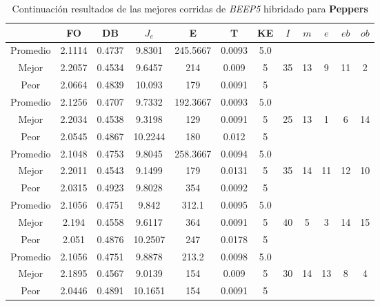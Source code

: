 \begin{table}[h!]
    \footnotesize
    \begin{center}
        \begin{tabular}{|c|c|c|c|c|c|c|c|c|c|c|c|}
        \hline
             & {\bf FO} & {\bf DB} & $J_e$ & {\bf E} & {\bf T} & {\bf KE} & $I$ & $m$ & $e$ & $eb$ & $ob$ \\
        \hline
        \hline
            Promedio  & 2.1114 & 0.4737 & 9.8301 & 245.5667 & 0.0093 & 5.0 &  &  &  &  & \\
            \cline{1-7}
            Mejor & 2.2057 & 0.4534  & 9.6457 & 214 & 0.009 & 5 & 35 & 13 & 9 & 11 & 2\\
            \cline{1-7}
            Peor & 2.0664 & 0.4839  & 10.093 & 179 & 0.0091 & 5 &  &  &  &  & \\
        \hline
        \hline
            Promedio  & 2.1256 & 0.4707 & 9.7332 & 192.3667 & 0.0093 & 5.0 &  &  &  &  & \\
            \cline{1-7}
            Mejor & 2.2034 & 0.4538  & 9.3198 & 129 & 0.0091 & 5 & 25 & 13 & 1 & 6 & 14\\
            \cline{1-7}
            Peor & 2.0545 & 0.4867  & 10.2244 & 180 & 0.012 & 5 &  &  &  &  & \\
        \hline
        \hline
            Promedio  & 2.1048 & 0.4753 & 9.8045 & 258.3667 & 0.0094 & 5.0 &  &  &  &  & \\
            \cline{1-7}
            Mejor & 2.2011 & 0.4543  & 9.1499 & 179 & 0.0131 & 5 & 35 & 14 & 11 & 12 & 10\\
            \cline{1-7}
            Peor & 2.0315 & 0.4923  & 9.8028 & 354 & 0.0092 & 5 &  &  &  &  & \\
        \hline
        \hline
            Promedio  & 2.1056 & 0.4751 & 9.842 & 312.1 & 0.0095 & 5.0 &  &  &  &  & \\
            \cline{1-7}
            Mejor & 2.194 & 0.4558  & 9.6117 & 364 & 0.0091 & 5 & 40 & 5 & 3 & 14 & 15\\
            \cline{1-7}
            Peor & 2.051 & 0.4876  & 10.2507 & 247 & 0.0178 & 5 &  &  &  &  & \\
        \hline
        \hline
            Promedio  & 2.1056 & 0.4751 & 9.8878 & 213.2 & 0.0098 & 5.0 &  &  &  &  & \\
            \cline{1-7}
            Mejor & 2.1895 & 0.4567  & 9.0139 & 154 & 0.009 & 5 & 30 & 14 & 13 & 8 & 4\\
            \cline{1-7}
            Peor & 2.0446 & 0.4891  & 10.1651 & 154 & 0.0091 & 5 &  &  &  &  & \\
        \hline
        \end{tabular}
        \caption{Continuaci\'on resultados de las mejores corridas de \emph{BEEP5} hibridado para {\bf Peppers}}
        \label{tb:ctableBEEP5}
    \end{center}
\end{table}
